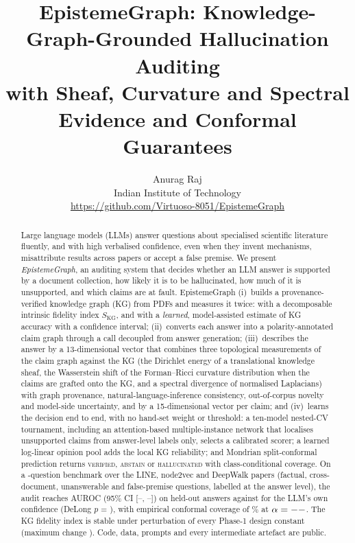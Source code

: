\documentclass[10pt,twocolumn]{article}
\title{\textbf{EpistemeGraph: Knowledge-Graph-Grounded Hallucination Auditing\\with Sheaf, Curvature and Spectral Evidence and Conformal Guarantees}}
\author{Anurag Raj\\
  \small Indian Institute of Technology \todo{department, campus}\\
  \small \texttt{\todo{email}}\quad \url{https://github.com/Virtuoso-8051/EpistemeGraph}}
\date{}
\theoremstyle{remark}
\newcommand{\TestAUCLo}{--}\newcommand{\TestAUCHi}{--}\newcommand{\LLMAUCLo}{--}\newcommand{\LLMAUCHi}{--}
\begin{document}
\maketitle

\begin{abstract}
Large language models (LLMs) answer questions about specialised scientific literature fluently, and with high
verbalised confidence, even when they invent mechanisms, misattribute results across papers or accept a false
premise. We present \emph{EpistemeGraph}, an auditing system that decides whether an LLM answer is supported by a
document collection, how likely it is to be hallucinated, how much of it is unsupported, and which claims are at
fault. EpistemeGraph (i)~builds a provenance-verified knowledge graph (KG) from PDFs and measures it twice: with a
decomposable intrinsic fidelity index $S_{\mathrm{KG}}$, and with a \emph{learned}, model-assisted estimate of KG
accuracy with a confidence interval; (ii)~converts each answer into a polarity-annotated claim graph through a call
decoupled from answer generation; (iii)~describes the answer by a 13-dimensional vector that combines three
topological measurements of the claim graph against the KG (the Dirichlet energy of a translational knowledge sheaf,
the Wasserstein shift of the Forman--Ricci curvature distribution when the claims are grafted onto the KG, and a
spectral divergence of normalised Laplacians) with graph provenance, natural-language-inference consistency,
out-of-corpus novelty and model-side uncertainty, and by a 15-dimensional vector per claim; and (iv)~learns the
decision end to end, with no hand-set weight or threshold: a ten-model nested-CV tournament, including an
attention-based multiple-instance network that localises unsupported claims from answer-level labels only, selects a
calibrated scorer; a learned log-linear opinion pool adds the local KG reliability; and Mondrian split-conformal
prediction returns \textsc{verified}, \textsc{abstain} or \textsc{hallucinated} with class-conditional coverage. On a
\NItems-question benchmark over the LINE, node2vec and DeepWalk papers (factual, cross-document, unanswerable and
false-premise questions, labelled at the answer level), the audit reaches AUROC \TestAUC{}
(95\% CI [\TestAUCLo, \TestAUCHi]) on held-out answers against \LLMAUC{} for the LLM's own confidence (DeLong
$p$ = \PvalLLM), with empirical conformal coverage of \Coverage\% at $\alpha=--$. The KG fidelity index is stable
under perturbation of every Phase-1 design constant (maximum change \SensMaxDev). Code, data, prompts and every
intermediate artefact are public.
\end{abstract}
\end{document}
